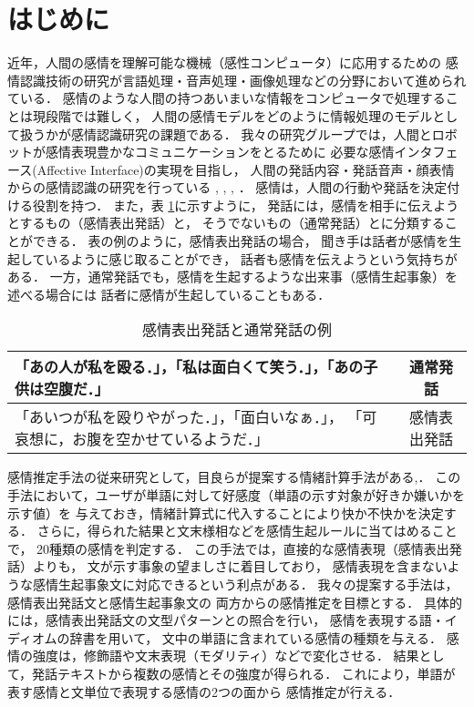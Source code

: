 \documentclass[japanese]{jnlp_1.3c}
\begin{document}
\maketitle




\section{はじめに}


近年，人間の感情を理解可能な機械（感性コンピュータ）に応用するための
感情認識技術の研究が言語処理・音声処理・画像処理などの分野において進められている．
感情のような人間の持つあいまいな情報をコンピュータで処理することは現段階では難しく，
人間の感情モデルをどのように情報処理のモデルとして扱うかが感情認識研究の課題である．
我々の研究グループでは，人間とロボットが感情表現豊かなコミュニケーションをとるために
必要な感情インタフェース(Affective Interface)の実現を目指し，
人間の発話内容・発話音声・顔表情からの感情認識の研究を行っている \cite{Ren}, \cite{ees}, \cite{ecorpus}, \cite{Ren2}．
感情は，人間の行動や発話を決定付ける役割を持つ．
また，表 \ref{tb:hatsuwa}に示すように，
発話には，感情を相手に伝えようとするもの（感情表出発話）と，
そうでないもの（通常発話）とに分類することができる．
表の例のように，感情表出発話の場合，
聞き手は話者が感情を生起しているように感じ取ることができ，
話者も感情を伝えようという気持ちがある．
一方，通常発話でも，感情を生起するような出来事（感情生起事象）を述べる場合には
話者に感情が生起していることもある．

\begin{table}[b]
\begin{center}
\caption{感情表出発話と通常発話の例}
\begin{tabular}{|p{10.5cm}|c|}
\hline
「あの人が私を殴る．」，「私は面白くて笑う．」，「あの子供は空腹だ．」&	通常発話 \\ \hline
「あいつが私を殴りやがった．」，「面白いなぁ．」， 「可哀想に，お腹を空かせているようだ．」& 感情表出発話 \\ \hline
\end{tabular}
\label{tb:hatsuwa}
\end{center}
\end{table}


感情推定手法の従来研究として，目良らが提案する情緒計算手法がある\cite{mera},\cite{mera2}．
この手法において，ユーザが単語に対して好感度（単語の示す対象が好きか嫌いかを示す値）を
与えておき，情緒計算式に代入することにより快か不快かを決定する．
さらに，得られた結果と文末様相などを感情生起ルールに当てはめることで，
20種類の感情を判定する．
この手法では，直接的な感情表現（感情表出発話）よりも，
文が示す事象の望ましさに着目しており，
感情表現を含まないような感情生起事象文に対応できるという利点がある．
我々の提案する手法は，感情表出発話文と感情生起事象文の
両方からの感情推定を目標とする．
具体的には，感情表出発話文の文型パターンとの照合を行い，
感情を表現する語・イディオムの辞書を用いて，
文中の単語に含まれている感情の種類を与える．
感情の強度は，修飾語や文末表現（モダリティ）などで変化させる．
結果として，発話テキストから複数の感情とその強度が得られる．
これにより，単語が表す感情と文単位で表現する感情の2つの面から
感情推定が行える．
\end{document}
